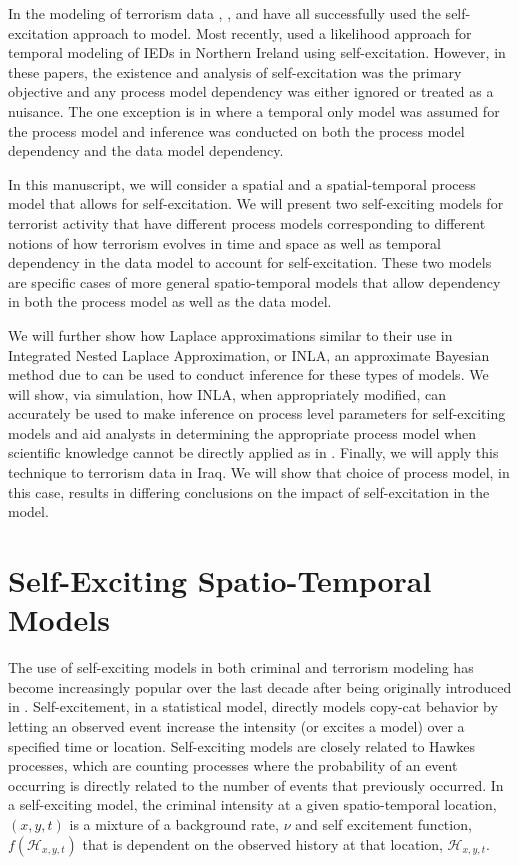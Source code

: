 \documentclass[11pt]{isuthesis}
\begin{document}
In the modeling of terrorism data \cite{lewis2012self}, \cite{porter2012self}, and \cite{mohler2013modeling} have all successfully used the self-excitation approach to model.  Most recently, \cite{tench2016spatio} used a likelihood approach for temporal modeling of IEDs in Northern Ireland using self-excitation.  However, in these papers, the existence and analysis of self-excitation was the primary objective and any process model dependency was either ignored or treated as a nuisance.  The one exception is in \cite{mohler2013modeling} where a temporal only model was assumed for the process model and inference was conducted on both the process model dependency and the data model dependency.

In this manuscript, we will consider a spatial and a spatial-temporal process model that allows for self-excitation.  We will present two self-exciting models for terrorist activity that have different process models corresponding to different notions of how terrorism evolves in time and space as well as temporal dependency in the data model to account for self-excitation.  These two models are specific cases of more general spatio-temporal models that allow dependency in both the process model as well as the data model.

We will further show how Laplace approximations similar to their use in Integrated Nested Laplace Approximation, or INLA, an approximate Bayesian method due to \cite{rue2009approximate} can be used to conduct inference for these types of models. We will show, via simulation, how INLA, when appropriately modified, can accurately be used to make inference on process level parameters for self-exciting models and aid analysts in determining the appropriate process model when scientific knowledge cannot be directly applied as in \cite{cressie2015statistics}.  Finally, we will apply this technique to terrorism data in Iraq.  We will show that choice of process model, in this case, results in differing conclusions on the impact of self-excitation in the model.  


\section{Self-Exciting Spatio-Temporal Models}
The use of self-exciting models in both criminal and terrorism modeling has become increasingly popular over the last decade after being originally introduced in \cite{short2008statistical}.  Self-excitement, in a statistical model, directly models copy-cat behavior by letting an observed event increase the intensity (or excites a model) over a specified time or location. Self-exciting models are closely related to Hawkes processes, which are counting processes where the probability of an event occurring is directly related to the number of events that previously occurred. In a self-exciting model, the criminal intensity at a given spatio-temporal location, $(x,y,t)$ is a mixture of a background rate, $\nu$ and self excitement function, $f(\mathcal{H}_{x,y,t})$ that is dependent on the observed history at that location, $\mathcal{H}_{x,y,t}$.  
\end{document}
